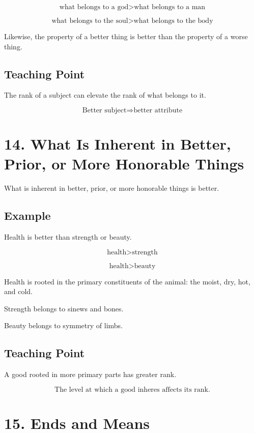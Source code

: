 \documentclass[12pt]{article}
\begin{document}
\[
\text{what belongs to a god} > \text{what belongs to a man}
\]

\[
\text{what belongs to the soul} > \text{what belongs to the body}
\]

Likewise, the property of a better thing is better than the property of a worse
thing.

\subsection*{Teaching Point}

The rank of a subject can elevate the rank of what belongs to it.

\[
\boxed{
\text{Better subject} \Rightarrow \text{better attribute}
}
\]

\section*{14. What Is Inherent in Better, Prior, or More Honorable Things}

What is inherent in better, prior, or more honorable things is better.

\subsection*{Example}

Health is better than strength or beauty.

\[
\text{health} > \text{strength}
\]

\[
\text{health} > \text{beauty}
\]

Health is rooted in the primary constituents of the animal: the moist, dry, hot,
and cold.

Strength belongs to sinews and bones.

Beauty belongs to symmetry of limbs.

\subsection*{Teaching Point}

A good rooted in more primary parts has greater rank.

\[
\boxed{
\text{The level at which a good inheres affects its rank.}
}
\]

\section*{15. Ends and Means}
\end{document}
